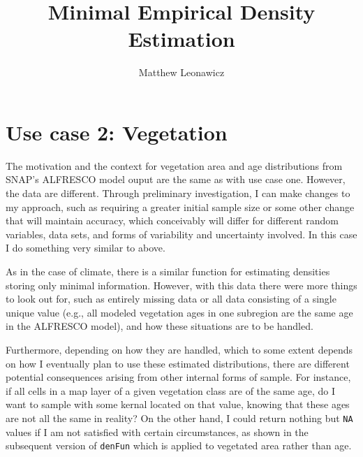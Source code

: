 \documentclass{article}\usepackage[]{graphicx}\usepackage[]{color}
\begin{document}
\title{Minimal Empirical Density Estimation}
\author{Matthew Leonawicz}
\maketitle





\section{Use case 2: Vegetation}
The motivation and the context for vegetation area and age distributions from SNAP's ALFRESCO model ouput are the same as with use case one.
However, the data are different.
Through preliminary investigation, I can make changes to my approach, such as requiring a greater initial sample size or some other change that will maintain accuracy,
which conceivably will differ for different random variables, data sets, and forms of variability and uncertainty involved.
In this case I do something very similar to above.

As in the case of climate, there is a similar function for estimating densities storing only minimal information.
However, with this data there were more things to look out for,
such as entirely missing data or all data consisting of a single unique value (e.g., all modeled vegetation ages in one subregion are the same age in the ALFRESCO model),
and how these situations are to be handled.

Furthermore, depending on how they are handled, which to some extent depends on how I eventually plan to use these estimated distributions,
there are different potential consequences arising from other internal forms of sample.
For instance, if all cells in a map layer of a given vegetation class are of the same age, do I want to sample with some kernal located on that value, knowing that these ages are not all the same in reality?
On the other hand, I could return nothing but \texttt{NA} values if I am not satisfied with certain circumstances, as shown in the subsequent version of \texttt{denFun} which is applied to vegetated area rather than age.
\end{document}
